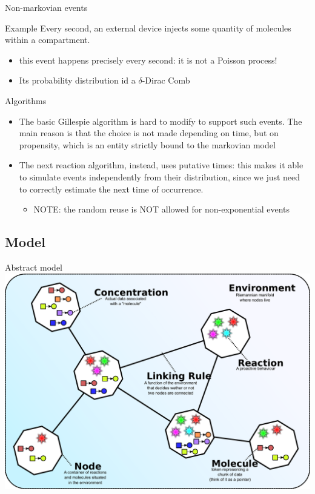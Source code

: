 \documentclass[presentation]{beamer}
\begin{document}
\begin{frame}{Non-markovian events}
 \begin{block}{Example}
   Every second, an external device injects some quantity of molecules within a compartment.
  \begin{itemize}
   \item this event happens precisely every second: it is not a Poisson process!
   \item Its probability distribution id a $\delta$-Dirac Comb
  \end{itemize}
 \end{block}
 \begin{block}{Algorithms}
  \begin{itemize}
   \item The basic Gillespie algorithm is hard to modify to support such events. The main reason is that the choice is not made depending on time, but on propensity, which is an entity strictly bound to the markovian model
   \item The next reaction algorithm, instead, uses putative times: this makes it able to simulate events independently from their distribution, since we just need to correctly estimate the next time of occurrence.
   \begin{itemize}
    \item NOTE: the random reuse is NOT allowed for non-exponential events
   \end{itemize}
  \end{itemize}
 \end{block}
\end{frame}

\subsection{Model}
\begin{frame}{Abstract model}
  \centering
  \includegraphics[height=0.85\textheight]{img/model}
\end{frame}
\end{document}
